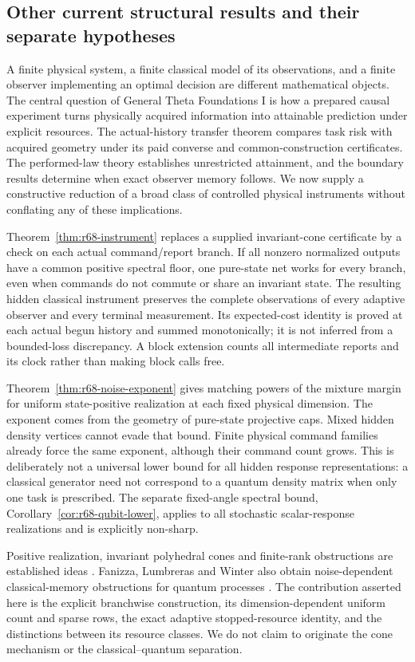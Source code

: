 \subsection*{Other current structural results and their separate hypotheses}
A finite physical system, a finite classical model of its observations, and a finite observer implementing an optimal decision are different mathematical objects. The central question of General Theta Foundations I is how a prepared causal experiment turns physically acquired information into attainable prediction under explicit resources. The actual-history transfer theorem compares task risk with acquired geometry under its paid converse and common-construction certificates. The performed-law theory establishes unrestricted attainment, and the boundary results determine when exact observer memory follows. We now supply a constructive reduction of a broad class of controlled physical instruments without conflating any of these implications.

Theorem~\ref{thm:r68-instrument} replaces a supplied invariant-cone certificate by a check on each actual command/report branch. If all nonzero normalized outputs have a common positive spectral floor, one pure-state net works for every branch, even when commands do not commute or share an invariant state. The resulting hidden classical instrument preserves the complete observations of every adaptive observer and every terminal measurement. Its expected-cost identity is proved at each actual begun history and summed monotonically; it is not inferred from a bounded-loss discrepancy. A block extension counts all intermediate reports and its clock rather than making block calls free.

Theorem~\ref{thm:r68-noise-exponent} gives matching powers of the mixture margin for uniform state-positive realization at each fixed physical dimension. The exponent comes from the geometry of pure-state projective caps. Mixed hidden density vertices cannot evade that bound. Finite physical command families already force the same exponent, although their command count grows. This is deliberately not a universal lower bound for all hidden response representations: a classical generator need not correspond to a quantum density matrix when only one task is prescribed. The separate fixed-angle spectral bound, Corollary~\ref{cor:r68-qubit-lower}, applies to all stochastic scalar-response realizations and is explicitly non-sharp.

Positive realization, invariant polyhedral cones and finite-rank obstructions are established ideas \cite{Heller65,CarlylePaz71,MonrasWinter14}. Fanizza, Lumbreras and Winter also obtain noise-dependent classical-memory obstructions for quantum processes \cite{Fanizza24}. The contribution asserted here is the explicit branchwise construction, its dimension-dependent uniform count and sparse rows, the exact adaptive stopped-resource identity, and the distinctions between its resource classes. We do not claim to originate the cone mechanism or the classical--quantum separation.

